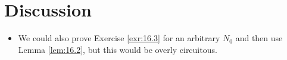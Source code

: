 \documentclass{report}
\begin{document}



\section{Discussion}
\begin{itemize}
    \item {}We could also prove Exercise \ref{exr:16.3} for an arbitrary $N_0$ and then use Lemma \ref{lem:16.2}, but this would be overly circuitous.
\end{itemize}
\end{document}
